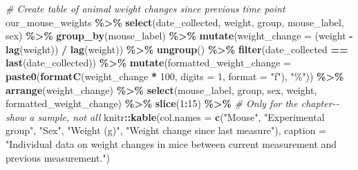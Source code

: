 \documentclass[
]{book}
\newenvironment{Shaded}{\begin{snugshade}}{\end{snugshade}}
\newcommand{\AttributeTok}[1]{\textcolor[rgb]{0.13,0.29,0.53}{#1}}
\newcommand{\CommentTok}[1]{\textcolor[rgb]{0.56,0.35,0.01}{\textit{#1}}}
\newcommand{\DecValTok}[1]{\textcolor[rgb]{0.00,0.00,0.81}{#1}}
\newcommand{\FunctionTok}[1]{\textcolor[rgb]{0.13,0.29,0.53}{\textbf{#1}}}
\newcommand{\NormalTok}[1]{#1}
\newcommand{\SpecialCharTok}[1]{\textcolor[rgb]{0.81,0.36,0.00}{\textbf{#1}}}
\newcommand{\StringTok}[1]{\textcolor[rgb]{0.31,0.60,0.02}{#1}}
\begin{document}
\begin{Shaded}
\begin{Highlighting}[]
\CommentTok{\# Create table of animal weight changes since previous time point}
\NormalTok{our\_mouse\_weights }\SpecialCharTok{\%\textgreater{}\%} 
  \FunctionTok{select}\NormalTok{(date\_collected, weight, group, mouse\_label, sex) }\SpecialCharTok{\%\textgreater{}\%} 
  \FunctionTok{group\_by}\NormalTok{(mouse\_label) }\SpecialCharTok{\%\textgreater{}\%} 
  \FunctionTok{mutate}\NormalTok{(}\AttributeTok{weight\_change =}\NormalTok{ (weight }\SpecialCharTok{{-}} \FunctionTok{lag}\NormalTok{(weight)) }\SpecialCharTok{/} \FunctionTok{lag}\NormalTok{(weight)) }\SpecialCharTok{\%\textgreater{}\%} 
  \FunctionTok{ungroup}\NormalTok{() }\SpecialCharTok{\%\textgreater{}\%} 
  \FunctionTok{filter}\NormalTok{(date\_collected }\SpecialCharTok{==} \FunctionTok{last}\NormalTok{(date\_collected)) }\SpecialCharTok{\%\textgreater{}\%} 
  \FunctionTok{mutate}\NormalTok{(}\AttributeTok{formatted\_weight\_change =} \FunctionTok{paste0}\NormalTok{(}\FunctionTok{formatC}\NormalTok{(weight\_change }\SpecialCharTok{*} \DecValTok{100}\NormalTok{, }
                                                  \AttributeTok{digits =} \DecValTok{1}\NormalTok{, }\AttributeTok{format =} \StringTok{"f"}\NormalTok{), }\StringTok{"\%"}\NormalTok{)) }\SpecialCharTok{\%\textgreater{}\%} 
  \FunctionTok{arrange}\NormalTok{(weight\_change) }\SpecialCharTok{\%\textgreater{}\%} 
  \FunctionTok{select}\NormalTok{(mouse\_label, group, sex, weight, formatted\_weight\_change) }\SpecialCharTok{\%\textgreater{}\%} 
  \FunctionTok{slice}\NormalTok{(}\DecValTok{1}\SpecialCharTok{:}\DecValTok{15}\NormalTok{) }\SpecialCharTok{\%\textgreater{}\%}  \CommentTok{\# Only for the chapter{-}{-}show a sample, not all}
\NormalTok{  knitr}\SpecialCharTok{::}\FunctionTok{kable}\NormalTok{(}\AttributeTok{col.names =} \FunctionTok{c}\NormalTok{(}\StringTok{"Mouse"}\NormalTok{, }\StringTok{"Experimental group"}\NormalTok{, }\StringTok{"Sex"}\NormalTok{, }
                             \StringTok{"Weight (g)"}\NormalTok{, }\StringTok{"Weight change since last measure"}\NormalTok{), }
               \AttributeTok{caption =} \StringTok{"Individual data on weight changes in mice between current measurement and previous measurement."}\NormalTok{)}
\end{Highlighting}
\end{Shaded}
\end{document}
